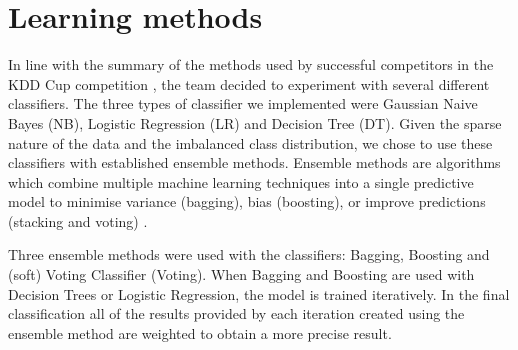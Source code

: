 \documentclass{article}
\begin{document}
\section{Learning methods}

In line with the summary of the methods used by successful competitors in the KDD Cup competition \cite{guyon2009analysis}, the team decided to experiment with several different classifiers.
The three types of classifier we implemented were Gaussian Naive Bayes (NB), Logistic Regression (LR) and Decision Tree (DT).
Given the sparse nature of the data and the imbalanced class distribution, we chose to use these classifiers with established ensemble methods.
Ensemble methods are algorithms which combine multiple machine learning techniques into a single predictive model to minimise variance (bagging), bias (boosting), or improve predictions (stacking and voting) \cite{ens}.

Three ensemble methods were used with the classifiers: Bagging, Boosting and (soft) Voting Classifier (Voting).
When Bagging and Boosting are used with Decision Trees or Logistic Regression, the model is trained iteratively.
In the final classification all of the results provided by each iteration created using the ensemble method are weighted to obtain a more precise result. 
\end{document}
